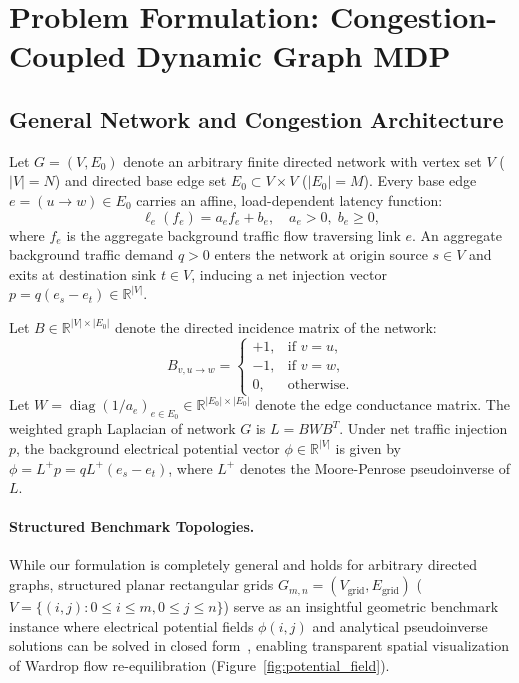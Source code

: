 \documentclass[11pt,a4paper]{article}
\begin{document}
\section{Problem Formulation: Congestion-Coupled Dynamic Graph MDP}
\label{sec:formulation}

\subsection{General Network and Congestion Architecture}
Let $G = (V, E_0)$ denote an arbitrary finite directed network with vertex set $V$ ($|V| = N$) and directed base edge set $E_0 \subset V \times V$ ($|E_0| = M$). Every base edge $e = (u \to w) \in E_0$ carries an affine, load-dependent latency function:
\begin{equation}
\ell_e(f_e) = a_e f_e + b_e, \quad a_e > 0, \; b_e \ge 0,
\end{equation}
where $f_e$ is the aggregate background traffic flow traversing link $e$. An aggregate background traffic demand $q > 0$ enters the network at origin source $s \in V$ and exits at destination sink $t \in V$, inducing a net injection vector $p = q (e_s - e_t) \in \mathbb{R}^{|V|}$.

Let $B \in \mathbb{R}^{|V| \times |E_0|}$ denote the directed incidence matrix of the network:
\begin{equation}
B_{v, u \to w} = 
\begin{cases}
+1, & \text{if } v = u, \\
-1, & \text{if } v = w, \\
0, & \text{otherwise.}
\end{cases}
\end{equation}
Let $W = \operatorname{diag}(1/a_e)_{e \in E_0} \in \mathbb{R}^{|E_0| \times |E_0|}$ denote the edge conductance matrix. The weighted graph Laplacian of network $G$ is $L = B W B^T$. Under net traffic injection $p$, the background electrical potential vector $\phi \in \mathbb{R}^{|V|}$ is given by $\phi = L^+ p = q L^+ (e_s - e_t)$, where $L^+$ denotes the Moore-Penrose pseudoinverse of $L$.

\paragraph{Structured Benchmark Topologies.}
While our formulation is completely general and holds for arbitrary directed graphs, structured planar rectangular grids $G_{m,n} = (V_{\text{grid}}, E_{\text{grid}})$ ($V = \{(i, j) : 0 \le i \le m, 0 \le j \le n\}$) serve as an insightful geometric benchmark instance where electrical potential fields $\phi(i, j)$ and analytical pseudoinverse solutions can be solved in closed form~\cite{lu2026braess}, enabling transparent spatial visualization of Wardrop flow re-equilibration (Figure~\ref{fig:potential_field}).
\end{document}
